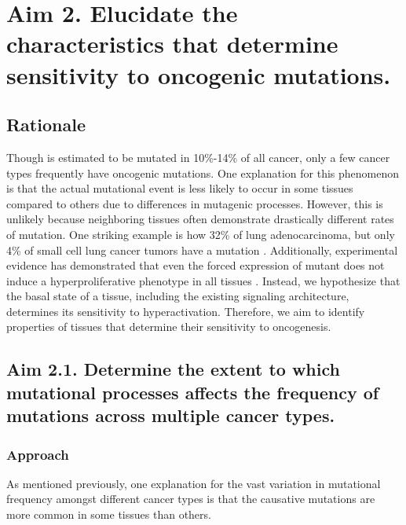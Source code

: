 \section{Aim 2. Elucidate the characteristics that determine sensitivity to oncogenic \KRAS{} mutations.}

\subsection*{Rationale}

Though \KRAS{} is estimated to be mutated in 10\%-14\% \cite{Bailey2018, Prior2020TheCancer} of all cancer, only a few cancer types frequently have oncogenic \KRAS{} mutations.
One explanation for this phenomenon is that the actual mutational event is less likely to occur in some tissues compared to others due to differences in mutagenic processes.
However, this is unlikely because neighboring tissues often demonstrate drastically different rates of \KRAS{} mutation.
One striking example is how 32\% of lung adenocarcinoma, but only 4\% of small cell lung cancer tumors have a \KRAS{} mutation \cite{Bailey2018, Prior2020TheCancer}.
Additionally, experimental evidence has demonstrated that even the forced expression of mutant \kras{} does not induce a hyperproliferative phenotype in all tissues \cite{Guerra2003TumorContext., Ray2011EpithelialModel,  Parikh2012MouseResponses}.
Instead, we hypothesize that the basal state of a tissue, including the existing signaling architecture, determines its sensitivity to \KRAS{} hyperactivation.
Therefore, we aim to identify properties of tissues that determine their sensitivity to \KRAS{} oncogenesis.


\subsection*{Aim 2.1. Determine the extent to which mutational processes affects the frequency of \KRAS{} mutations across multiple cancer types.}

\subsubsection*{Approach}

As mentioned previously, one explanation for the vast variation in \KRAS{} mutational frequency amongst different cancer types is that the causative mutations are more common in some tissues than others.


